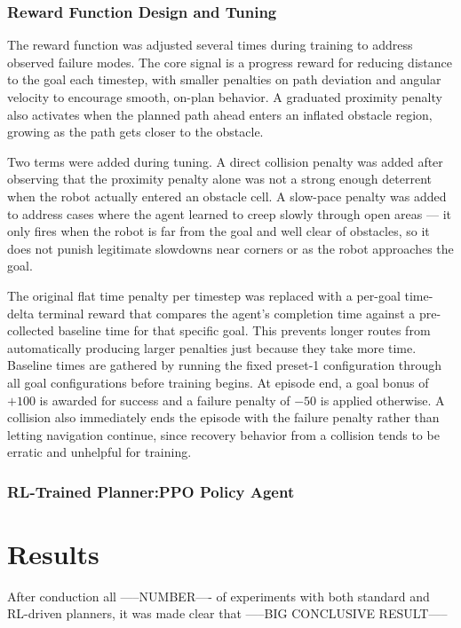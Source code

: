 \documentclass[conference]{IEEEtran}
\begin{document}
    \subsubsection{Reward Function Design and Tuning}
    The reward function was adjusted several times during training to address observed failure modes. The core signal is a
    progress reward for reducing distance to the goal each timestep, with smaller penalties on path deviation and angular
    velocity to encourage smooth, on-plan behavior. A graduated proximity penalty also activates when the planned path ahead
    enters an inflated obstacle region, growing as the path gets closer to the obstacle.

    Two terms were added during tuning. A direct collision penalty was added after observing that the proximity penalty alone
    was not a strong enough deterrent when the robot actually entered an obstacle cell. A slow-pace penalty was added to
    address cases where the agent learned to creep slowly through open areas --- it only fires when the robot is far from the
    goal and well clear of obstacles, so it does not punish legitimate slowdowns near corners or as the robot approaches
    the goal.

    The original flat time penalty per timestep was replaced with a per-goal time-delta terminal reward that compares the
    agent's completion time against a pre-collected baseline time for that specific goal. This prevents longer routes from
    automatically producing larger penalties just because they take more time. Baseline times are gathered by running the
    fixed preset-1 configuration through all goal configurations before training begins. At episode end, a goal bonus of
    $+100$ is awarded for success and a failure penalty of $-50$ is applied otherwise. A collision also immediately ends
    the episode with the failure penalty rather than letting navigation continue, since recovery behavior from a collision
    tends to be erratic and unhelpful for training.

    \subsubsection{RL-Trained Planner:PPO Policy Agent}

\section{Results}
After conduction all -----NUMBER---- of experiments with both standard and RL-driven planners, it was made clear that -----BIG CONCLUSIVE RESULT-----
\end{document}
